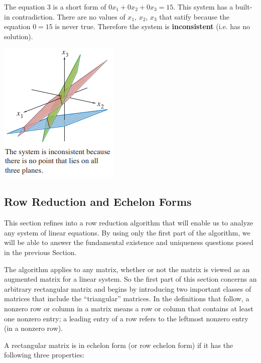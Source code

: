 \documentclass{article}
\begin{document}
\noindent The equation 3 is a short form of $0x_1 + 0x_2 + 0x_3 = 15$. This system has a built-in contradiction. There are no values of $x_1$, $x_2$, $x_3$ that satify because the equation $0=15$ is never true. Therefore the system is \textbf{inconsistent} (i.e. has no solution).

\includegraphics{image3.png}

\subsection{Row Reduction and Echelon Forms}

This section refines into a row reduction algorithm that will enable us to analyze any system of linear equations. By using only the first part of the algorithm, we will be able to answer the fundamental existence and uniqueness questions posed in the previous Section.\newline

The algorithm applies to any matrix, whether or not the matrix is viewed as an augmented matrix for a linear system. So the first part of this section concerns an arbitrary rectangular matrix and begins by introducing two important classes of matrices that include the “triangular” matrices. In the definitions that follow, a nonzero row or column in a matrix means a row or column that contains at least one nonzero entry; a leading entry of a row refers to the leftmost nonzero entry (in a nonzero row).\newline

A rectangular matrix is in echelon form (or row echelon form) if it has the following three properties:
\end{document}
